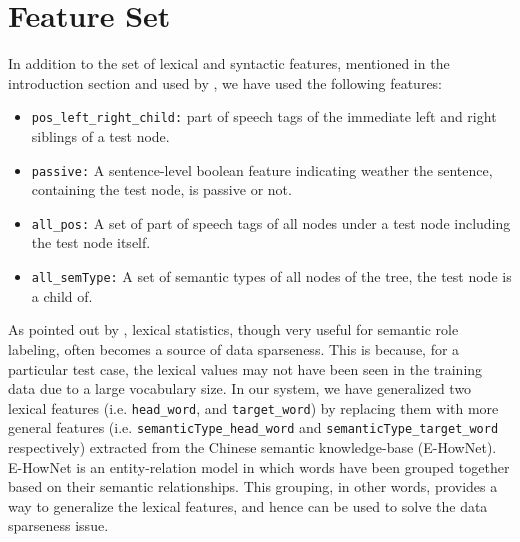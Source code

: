 \section{Feature Set}
In addition to the set of lexical and syntactic features, mentioned in the introduction section and used by \cite{you-chen:2004}, we have used the following features:
\begin{itemize}

\item \verb+pos_left_right_child:+ part of speech tags of the immediate left and right siblings of a test node.
\item \verb+passive:+ A sentence-level boolean feature indicating weather the sentence, containing the test node, is passive or not.
\item \verb+all_pos:+ A set of part of speech tags of all nodes under a test node including the test node itself.
\item \verb+all_semType:+ A set of semantic types of all nodes of the tree, the test node is a child of.
\end{itemize}
As pointed out by \cite{Gildea:2002}, lexical statistics, though very useful for semantic role labeling, often becomes a source of data sparseness. This is because, for a particular test case, the lexical values may not have been seen in the training data due to a large vocabulary size. 
In our system, we have generalized two lexical features (i.e. \verb+head_word+, and \verb+target_word+) by replacing them with more general features (i.e. \verb+semanticType_head_word+ and \verb+semanticType_target_word+ respectively) extracted from the Chinese semantic knowledge-base (E-HowNet). \\
E-HowNet is an entity-relation model in which words have been grouped together based on their semantic relationships. This grouping, in other words, provides a way to generalize the lexical features, and hence can be used to solve the data sparseness issue.\\
